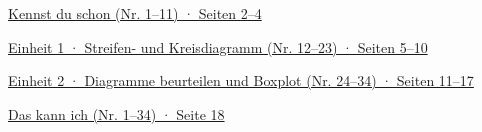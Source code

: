 \noindent\hyperlink{zone}{Kennst du schon (Nr. 1–11) · Seiten 2–4}\par\smallskip
\noindent\hyperlink{e1}{Einheit 1 · Streifen- und Kreisdiagramm (Nr. 12–23) · Seiten 5–10}\par\smallskip
\noindent\hyperlink{e2}{Einheit 2 · Diagramme beurteilen und Boxplot (Nr. 24–34) · Seiten 11–17}\par\smallskip
\noindent\hyperlink{abhaken}{Das kann ich (Nr. 1–34) · Seite 18}\par\smallskip

